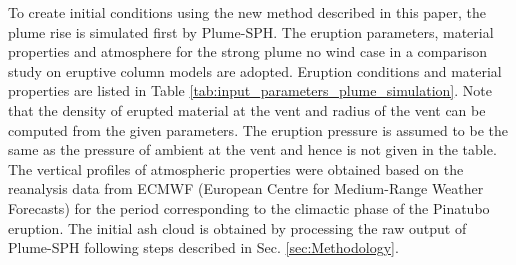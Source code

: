 \documentclass[draft,linenumbers]{agujournal2019}
\begin{document}
To create initial conditions using the new method described in this paper, the plume rise is simulated first by Plume-SPH. The eruption parameters, material properties and atmosphere for the strong plume no wind case in a comparison study on eruptive column models \citep {costa2016results} are adopted. Eruption conditions and material properties are listed in Table \ref{tab:input_parameters_plume_simulation}. Note that the density of erupted material at the vent and radius of the vent can be computed from the given parameters. The eruption pressure is assumed to be the same as the pressure of ambient at the vent and hence is not given in the table. The vertical profiles of atmospheric properties were obtained based on the reanalysis data from ECMWF (European Centre for Medium-Range Weather Forecasts) for the period corresponding to the climactic phase of the Pinatubo eruption. The initial ash cloud is obtained by processing the raw output of Plume-SPH following steps described in Sec. \ref{sec:Methodology}.
\end{document}
